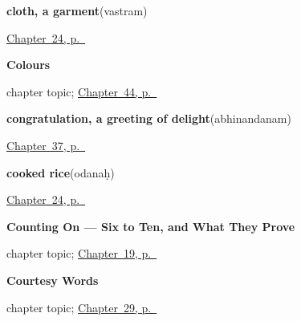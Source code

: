 \noindent\begin{minipage}[t]{\linewidth}
\raggedright
\textbf{cloth, a garment}\enspace\emph{}\enspace(vastram)\par
\footnotesize \hyperref[ch:sa-ask-for]{Chapter~24, p.~\pageref*{ch:sa-ask-for}}
\end{minipage}\par\smallskip

\noindent\begin{minipage}[t]{\linewidth}
\raggedright
\textbf{Colours}\par
\footnotesize chapter topic; \hyperref[ch:sa-colours]{Chapter~44, p.~\pageref*{ch:sa-colours}}
\end{minipage}\par\smallskip

\noindent\begin{minipage}[t]{\linewidth}
\raggedright
\textbf{congratulation, a greeting of delight}\enspace\emph{}\enspace(abhinandanam)\par
\footnotesize \hyperref[ch:sa-courtesy-more]{Chapter~37, p.~\pageref*{ch:sa-courtesy-more}}
\end{minipage}\par\smallskip

\noindent\begin{minipage}[t]{\linewidth}
\raggedright
\textbf{cooked rice}\enspace\emph{}\enspace(odanaḥ)\par
\footnotesize \hyperref[ch:sa-ask-for]{Chapter~24, p.~\pageref*{ch:sa-ask-for}}
\end{minipage}\par\smallskip

\noindent\begin{minipage}[t]{\linewidth}
\raggedright
\textbf{Counting On --- Six to Ten, and What They Prove}\par
\footnotesize chapter topic; \hyperref[ch:sa-numbers-6-10]{Chapter~19, p.~\pageref*{ch:sa-numbers-6-10}}
\end{minipage}\par\smallskip

\noindent\begin{minipage}[t]{\linewidth}
\raggedright
\textbf{Courtesy Words}\par
\footnotesize chapter topic; \hyperref[ch:sa-courtesy]{Chapter~29, p.~\pageref*{ch:sa-courtesy}}
\end{minipage}\par\smallskip

